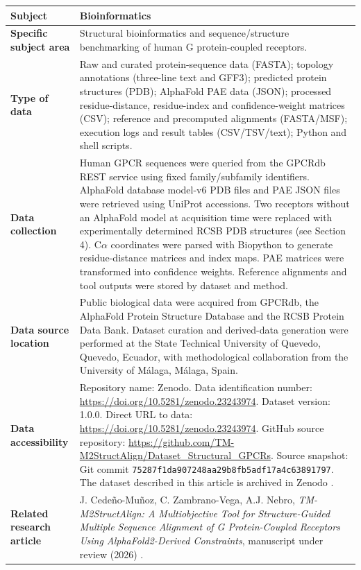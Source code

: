 \documentclass[a4paper,12pt]{article}
\begin{document}
	\begin{longtable}{|p{4cm}|p{11cm}|}
		\hline
		\textbf{Subject} & Bioinformatics \\ \hline
		\textbf{Specific subject area} & Structural bioinformatics and sequence/structure benchmarking of human G protein-coupled receptors. \\ \hline
		\textbf{Type of data} & Raw and curated protein-sequence data (FASTA); topology annotations (three-line text and GFF3); predicted protein structures (PDB); AlphaFold PAE data (JSON); processed residue-distance, residue-index and confidence-weight matrices (CSV); reference and precomputed alignments (FASTA/MSF); execution logs and result tables (CSV/TSV/text); Python and shell scripts. \\ \hline
		\textbf{Data collection} & Human GPCR sequences were queried from the GPCRdb REST service using fixed family/subfamily identifiers. AlphaFold database model-v6 PDB files and PAE JSON files were retrieved using UniProt accessions. Two receptors without an AlphaFold model at acquisition time were replaced with experimentally determined RCSB PDB structures (see Section 4). C$\alpha$ coordinates were parsed with Biopython to generate residue-distance matrices and index maps. PAE matrices were transformed into confidence weights. Reference alignments and tool outputs were stored by dataset and method. \\ \hline
		\textbf{Data source location} & Public biological data were acquired from GPCRdb, the AlphaFold Protein Structure Database and the RCSB Protein Data Bank. Dataset curation and derived-data generation were performed at the State Technical University of Quevedo, Quevedo, Ecuador, with methodological collaboration from the University of M\'alaga, M\'alaga, Spain. \\ \hline
		\textbf{Data accessibility} &
		Repository name: Zenodo. \newline
		Data identification number:
		\url{https://doi.org/10.5281/zenodo.23243974}. \newline
		Dataset version: 1.0.0. \newline
		Direct URL to data:
		\url{https://doi.org/10.5281/zenodo.23243974}. \newline
		GitHub source repository:
		\url{https://github.com/TM-M2StructAlign/Dataset_Structural_GPCRs}. \newline
		Source snapshot: Git commit
		\texttt{75287f1da907248aa29b8fb5adf17a4c63891797}. \newline
		The dataset described in this article is archived in Zenodo
		\cite{zambrano2026gpcrdataset}.
		\\ \hline
		\textbf{Related research article} & J. Cede\~no-Mu\~noz, C. Zambrano-Vega, A.J. Nebro, \textit{TM-M2StructAlign: A Multiobjective Tool for Structure-Guided Multiple Sequence Alignment of G Protein-Coupled Receptors Using AlphaFold2-Derived Constraints}, manuscript under review (2026) \cite{cedeno2026structalign}. \\ \hline
	\end{longtable}
	\setcounter{table}{0}
	
\end{document}
